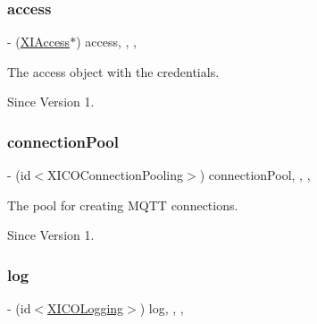 \subsubsection{\texorpdfstring{access}{access}}
{\footnotesize\ttfamily -\/ (\hyperlink{class_x_i_access}{X\+I\+Access}$\ast$) access\hspace{0.3cm}{\ttfamily [read]}, {\ttfamily [write]}, {\ttfamily [nonatomic]}, {\ttfamily [strong]}}



The access object with the credentials. 

\begin{DoxySince}{Since}
Version 1. 
\end{DoxySince}
\hypertarget{category_x_i_session_internal_07_08_adc8bea01e6c36e7e28e5c68c028c4b5d}{}\label{category_x_i_session_internal_07_08_adc8bea01e6c36e7e28e5c68c028c4b5d} 
\subsubsection{\texorpdfstring{connection\+Pool}{connectionPool}}
{\footnotesize\ttfamily -\/ (id$<$X\+I\+C\+O\+Connection\+Pooling$>$) connection\+Pool\hspace{0.3cm}{\ttfamily [read]}, {\ttfamily [write]}, {\ttfamily [nonatomic]}, {\ttfamily [strong]}}



The pool for creating M\+Q\+TT connections. 

\begin{DoxySince}{Since}
Version 1. 
\end{DoxySince}
\hypertarget{category_x_i_session_internal_07_08_aec666be425dd3c45da3bac34d87d5e1b}{}\label{category_x_i_session_internal_07_08_aec666be425dd3c45da3bac34d87d5e1b} 
\subsubsection{\texorpdfstring{log}{log}}
{\footnotesize\ttfamily -\/ (id$<$\hyperlink{protocol_x_i_c_o_logging-p}{X\+I\+C\+O\+Logging}$>$) log\hspace{0.3cm}{\ttfamily [read]}, {\ttfamily [write]}, {\ttfamily [nonatomic]}, {\ttfamily [strong]}}



